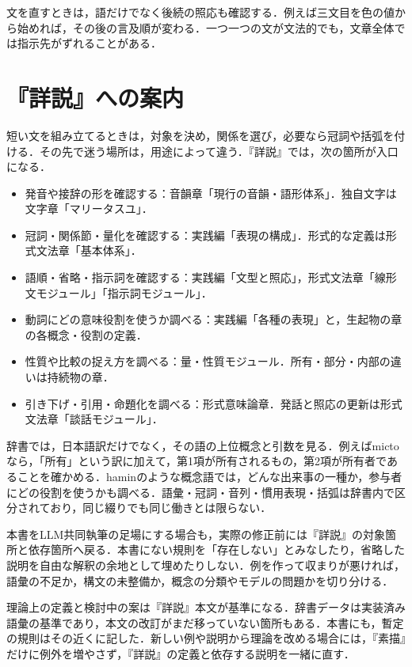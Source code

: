 \documentclass[b5paper, 10pt]{ltjsarticle}
\newcommand{\ko}[1]{\textsf{#1}}
\begin{document}
文を直すときは，語だけでなく後続の照応も確認する．例えば三文目を色の値から始めれば，その後の言及順が変わる．一つ一つの文が文法的でも，文章全体では指示先がずれることがある．

\section{『詳説』への案内}
短い文を組み立てるときは，対象を決め，関係を選び，必要なら冠詞や括弧を付ける．その先で迷う場所は，用途によって違う．『詳説』では，次の箇所が入口になる．
\begin{itemize}
    \item 発音や接辞の形を確認する：音韻章「現行の音韻・語形体系」．独自文字は文字章「マリータスユ」．
    \item 冠詞・関係節・量化を確認する：実践編「表現の構成」．形式的な定義は形式文法章「基本体系」．
    \item 語順・省略・指示詞を確認する：実践編「文型と照応」，形式文法章「線形文モジュール」「指示詞モジュール」．
    \item 動詞にどの意味役割を使うか調べる：実践編「各種の表現」と，生起物の章の各概念・役割の定義．
    \item 性質や比較の捉え方を調べる：量・性質モジュール．所有・部分・内部の違いは持続物の章．
    \item 引き下げ・引用・命題化を調べる：形式意味論章．発話と照応の更新は形式文法章「談話モジュール」．
\end{itemize}

辞書では，日本語訳だけでなく，その語の上位概念と引数を見る．例えば\ko{micto}なら，「所有」という訳に加えて，第1項が所有されるもの，第2項が所有者であることを確かめる．\ko{hamin}のような概念語では，どんな出来事の一種か，参与者にどの役割を使うかも調べる．語彙・冠詞・音列・慣用表現・括弧は辞書内で区分されており，同じ綴りでも同じ働きとは限らない．

本書をLLM共同執筆の足場にする場合も，実際の修正前には『詳説』の対象箇所と依存箇所へ戻る．本書にない規則を「存在しない」とみなしたり，省略した説明を自由な解釈の余地として埋めたりしない．例を作って収まりが悪ければ，語彙の不足か，構文の未整備か，概念の分類やモデルの問題かを切り分ける．

理論上の定義と検討中の案は『詳説』本文が基準になる．辞書データは実装済み語彙の基準であり，本文の改訂がまだ移っていない箇所もある．本書にも，暫定の規則はその近くに記した．新しい例や説明から理論を改める場合には，『素描』だけに例外を増やさず，『詳説』の定義と依存する説明を一緒に直す．
\end{document}
